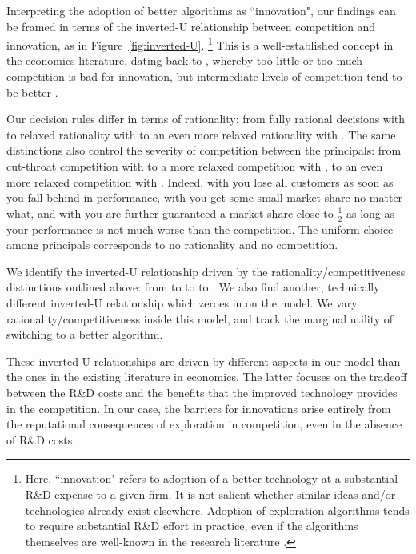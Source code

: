 Interpreting the adoption of better algorithms as ``innovation", our findings can be framed in terms of the inverted-U relationship between competition and innovation, as in Figure~\ref{fig:inverted-U}.%
\footnote{Here, ``innovation" refers to adoption of a better technology at a substantial R\&D expense to a given firm. It is not salient whether similar ideas and/or technologies already exist elsewhere. Adoption of exploration algorithms tends to require substantial R\&D effort in practice, even if the algorithms themselves are well-known in the research literature \citep[\eg see][]{DS-arxiv}.}
This is a well-established concept in the economics literature, dating back to \cite{Schumpeter-42}, whereby too little or too much competition is bad for innovation, but intermediate levels of competition tend to be better \citep[\eg][]{Aghion-QJE05,Vives-08}.

Our decision rules differ in terms of rationality: from fully rational decisions with \HardMax to relaxed rationality with \HardMaxRandom to an even more relaxed rationality with \SoftMaxRandom. The same distinctions also control the severity of competition between the principals: from cut-throat competition with \HardMax to a more relaxed competition with \HardMaxRandom, to an even more relaxed competition with \SoftMaxRandom. Indeed, with \HardMax you lose all customers as soon as you fall behind in performance, with \HardMaxRandom you get some small market share no matter what, and with \SoftMaxRandom you are further guaranteed a market share close to $\tfrac12$ as long as your performance is not much worse than the competition. The uniform choice among principals corresponds to no rationality and no competition. 


We identify the inverted-U relationship driven by the rationality/competitiveness distinctions outlined above: from \HardMax to \HardMaxRandom to \SoftMaxRandom to \Uniform. We also find another, technically different inverted-U relationship which zeroes in on the \HardMaxRandom model. We vary rationality/competitiveness inside this model, and track the marginal utility of switching to a better algorithm.

These inverted-U relationships are driven by different aspects in our model than the ones in the existing literature in economics. The latter focuses on the tradeoff between the R\&D costs and the benefits that the improved technology provides in the competition. In our case, the barriers for innovations arise entirely from the reputational consequences of exploration in competition, even in the absence of R\&D costs.



